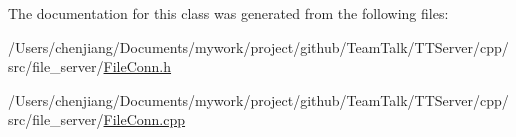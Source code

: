 The documentation for this class was generated from the following files\+:\begin{DoxyCompactItemize}
\item 
/\+Users/chenjiang/\+Documents/mywork/project/github/\+Team\+Talk/\+T\+T\+Server/cpp/src/file\+\_\+server/\hyperlink{_file_conn_8h}{File\+Conn.\+h}\item 
/\+Users/chenjiang/\+Documents/mywork/project/github/\+Team\+Talk/\+T\+T\+Server/cpp/src/file\+\_\+server/\hyperlink{_file_conn_8cpp}{File\+Conn.\+cpp}\end{DoxyCompactItemize}
